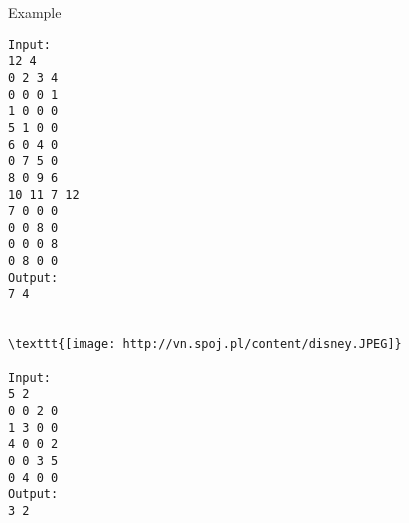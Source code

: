 Example
\begin{verbatim}
Input:
12 4
0 2 3 4
0 0 0 1
1 0 0 0
5 1 0 0
6 0 4 0
0 7 5 0
8 0 9 6
10 11 7 12
7 0 0 0
0 0 8 0
0 0 0 8
0 8 0 0
Output:
7 4


\texttt{[image: http://vn.spoj.pl/content/disney.JPEG]}

Input:
5 2
0 0 2 0
1 3 0 0
4 0 0 2
0 0 3 5
0 4 0 0
Output:
3 2

\end{verbatim}